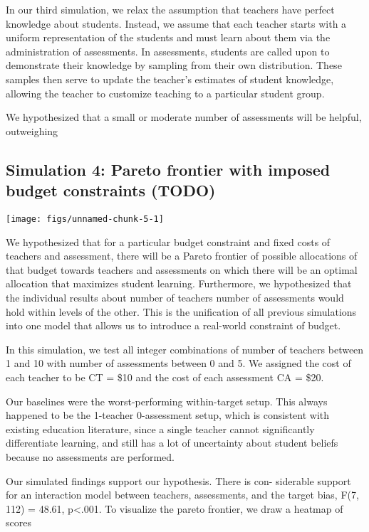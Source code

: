 \documentclass[10pt, letterpaper]{article}
\newenvironment{CodeChunk}{}{}
\begin{document}
In our third simulation, we relax the assumption that teachers have
perfect knowledge about students. Instead, we assume that each teacher
starts with a uniform representation of the students and must learn
about them via the administration of assessments. In assessments,
students are called upon to demonstrate their knowledge by sampling from
their own distribution. These samples then serve to update the teacher's
estimates of student knowledge, allowing the teacher to customize
teaching to a particular student group.

We hypothesized that a small or moderate number of assessments will be
helpful, outweighing

\subsection{Simulation 4: Pareto frontier with imposed budget
constraints
(TODO)}\label{simulation-4-pareto-frontier-with-imposed-budget-constraints-todo}

\begin{CodeChunk}

\texttt{[image: figs/unnamed-chunk-5-1]} \end{CodeChunk}

We hypothesized that for a particular budget constraint and fixed costs
of teachers and assessment, there will be a Pareto frontier of possible
allocations of that budget towards teachers and assessments on which
there will be an optimal allocation that maximizes student learning.
Furthermore, we hypothesized that the individual results about number of
teachers number of assessments would hold within levels of the other.
This is the unification of all previous simulations into one model that
allows us to introduce a real-world constraint of budget.

In this simulation, we test all integer combinations of number of
teachers between 1 and 10 with number of assessments between 0 and 5. We
assigned the cost of each teacher to be CT = \$10 and the cost of each
assessment CA = \$20.

Our baselines were the worst-performing within-target setup. This always
happened to be the 1-teacher 0-assessment setup, which is consistent
with existing education literature, since a single teacher cannot
significantly differentiate learning, and still has a lot of uncertainty
about student beliefs because no assessments are performed.

Our simulated findings support our hypothesis. There is con- siderable
support for an interaction model between teachers, assessments, and the
target bias, F(7, 112) = 48.61, p\textless{}.001. To visualize the
pareto frontier, we draw a heatmap of scores
\end{document}

